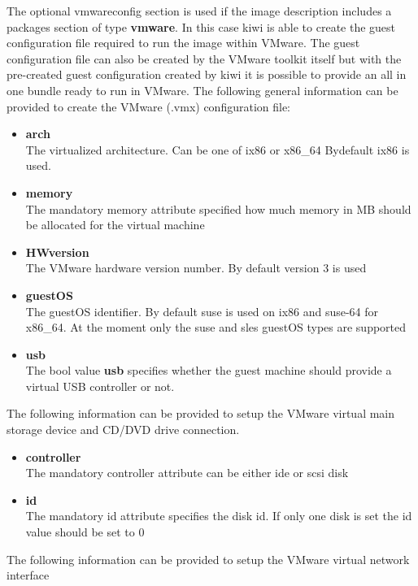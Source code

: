 The optional vmwareconfig section is used if the image description
includes a packages section of type \textbf{vmware}. In this case kiwi
is able to create the guest configuration file required to run the
image within VMware. The guest configuration file can also be created
by the VMware toolkit itself but with the pre-created guest configuration
created by kiwi it is possible to provide an all in one bundle ready
to run in VMware. The following general information can be provided to
create the VMware (.vmx) configuration file:

\begin{itemize}
\item \textbf{arch}\\
      The virtualized architecture. Can be one of ix86 or x86\_64
      Bydefault ix86 is used.
\item \textbf{memory}\\
      The mandatory memory attribute specified how much memory in MB
      should be allocated for the virtual machine
\item \textbf{HWversion}\\
      The VMware hardware version number. By default version 3 is used
\item \textbf{guestOS}\\
      The guestOS identifier. By default suse is used on ix86 and suse-64
      for x86\_64. At the moment only the suse and sles guestOS types
      are supported
\item \textbf{usb}\\
      The bool value \textbf{usb} specifies whether the guest machine
      should provide a virtual USB controller or not.
\end{itemize}

The following information can be provided to setup the VMware virtual
main storage device and CD/DVD drive connection.

\begin{itemize}
\item \textbf{controller}\\
      The mandatory controller attribute can be either ide or scsi disk
\item \textbf{id}\\
      The mandatory id attribute specifies the disk id. If only one
      disk is set the id value should be set to 0 
\end{itemize}

The following information can be provided to setup the VMware virtual
network interface

